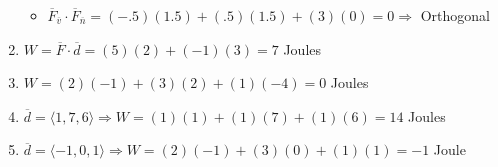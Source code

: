 \begin{enumerate}
      \begin{itemize}

        \item $\overline{F}_{\overline{v}} \cdot \overline{F}_{\overline{n}} = (-.5)(1.5) + (.5)(1.5) + (3)(0) = 0 \Rightarrow$ Orthogonal \textcolor{green}{\checkmark}

      \end{itemize}

    \setcounter{enumi}{44}

  \item $W = \overline{F}\cdot\overline{d} = (5)(2) + (-1)(3) = 7$ Joules

  \item $W = (2)(-1) + (3)(2) + (1)(-4) = 0$ Joules

  \item $\overline{d} = \langle 1, 7, 6 \rangle \Rightarrow W = (1)(1) + (1)(7) + (1)(6) = 14$ Joules

  \item $\overline{d} = \langle -1, 0, 1 \rangle \Rightarrow W = (2)(-1) + (3)(0) + (1)(1) = -1$ Joule

\end{enumerate}




